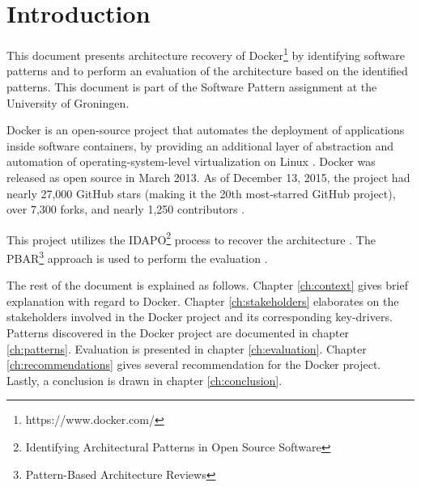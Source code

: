 \clearpage
\chapter{Introduction}
\label{ch:introduction}
This document presents architecture recovery of Docker\footnote{https://www.docker.com/} by identifying software patterns and to perform an evaluation of the architecture based on the identified patterns. This document is part of the Software Pattern assignment at the University of Groningen.

Docker is an open-source project that automates the deployment of applications inside software containers, by providing an additional layer of abstraction and automation of operating-system-level virtualization on Linux \cite{dockerdef}. Docker was released as open source in March 2013. As of December 13, 2015, the project had nearly 27,000 GitHub stars (making it the 20th most-starred GitHub project), over 7,300 forks, and nearly 1,250 contributors \cite{dockerrepo}.

This project utilizes the IDAPO\footnote{Identifying Architectural Patterns in Open Source Software} process to recover the architecture \cite{idapo}. The PBAR\footnote{Pattern-Based Architecture Reviews} approach is used to perform the evaluation \cite{pbar}.




The rest of the document is explained as follows. Chapter \ref{ch:context} gives brief explanation with regard to Docker. Chapter \ref{ch:stakeholders} elaborates on the stakeholders involved in the Docker project and its corresponding key-drivers. Patterns discovered in the Docker project are documented in chapter \ref{ch:patterns}. Evaluation is presented in chapter \ref{ch:evaluation}. Chapter \ref{ch:recommendations} gives several recommendation for the Docker project. Lastly, a conclusion is drawn in chapter \ref{ch:conclusion}.